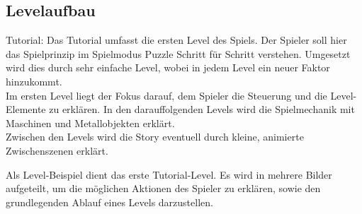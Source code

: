 \documentclass{scrartcl}
\begin{document}
\subsection{Levelaufbau}  \label{subsection:Levelaufbau}


\begin{description}
	
	\begin{minipage}{1\textwidth}
		\item[Tutorial:] \label{Levelaufbau:Tutorial}  Das Tutorial umfasst die ersten Level des Spiels. Der Spieler soll hier das Spielprinzip im Spielmodus Puzzle Schritt für Schritt verstehen.
		Umgesetzt wird dies durch sehr einfache Level, wobei in jedem Level ein neuer Faktor hinzukommt.\\
		Im ersten Level liegt der Fokus darauf, dem Spieler die Steuerung und die Level-Elemente zu erklären. 
		In den darauffolgenden Levels wird die Spielmechanik mit Maschinen und Metallobjekten erklärt.\\
		Zwischen den Levels wird die Story eventuell durch kleine, animierte Zwischenszenen erklärt.\\		 
	\end{minipage}
		

	\item[Levelbeispiel:] \label{Levelaufbau:Levelbeispiel} Als Level-Beispiel dient das erste Tutorial-Level. Es wird in mehrere Bilder aufgeteilt, um die möglichen Aktionen des Spieler zu erklären, sowie den grundlegenden Ablauf eines Levels darzustellen.\\
	

\end{description}
\end{document}
